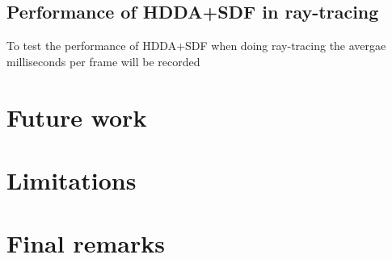 \subsection{Performance of HDDA+SDF in ray-tracing}

To test the performance of HDDA+SDF when doing ray-tracing the avergae milliseconds per frame will be recorded

\section{Future work}

\section{Limitations}

\section{Final remarks}
